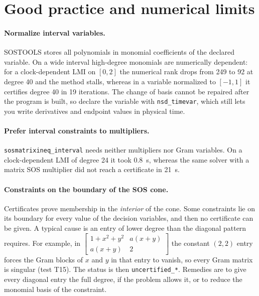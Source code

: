 \documentclass[11pt,a4paper]{article}
\newcommand{\code}[1]{\texttt{#1}}
\begin{document}
\section{Good practice and numerical limits}\label{sec:practice}
\paragraph{Normalize interval variables.} SOSTOOLS stores all polynomials in monomial coefficients of the declared variable. On a wide interval high-degree monomials are numerically dependent: for a clock-dependent LMI on $[0,2]$ the numerical rank drops from 249 to 92 at degree 40 and the method stalls, whereas in a variable normalized to $[-1,1]$ it certifies degree 40 in 19 iterations. The change of basis cannot be repaired after the program is built, so declare the variable with \code{nsd\_timevar}, which still lets you write derivatives and endpoint values in physical time.

\paragraph{Prefer interval constraints to multipliers.} \code{sosmatrixineq\_interval} needs neither multipliers nor Gram variables. On a clock-dependent LMI of degree 24 it took 0.8~s, whereas the same solver with a matrix SOS multiplier did not reach a certificate in 21~s.

\paragraph{Constraints on the boundary of the SOS cone.} Certificates prove membership in the \emph{interior} of the cone. Some constraints lie on its boundary for every value of the decision variables, and then no certificate can be given. A typical cause is an entry of lower degree than the diagonal pattern requires. For example, in $\begin{bmatrix}1+x^2+y^2&a(x+y)\\a(x+y)&2\end{bmatrix}$ the constant $(2,2)$ entry forces the Gram blocks of $x$ and $y$ in that entry to vanish, so every Gram matrix is singular (test T15). The status is then \code{uncertified\_*}. Remedies are to give every diagonal entry the full degree, if the problem allows it, or to reduce the monomial basis of the constraint.
\end{document}
